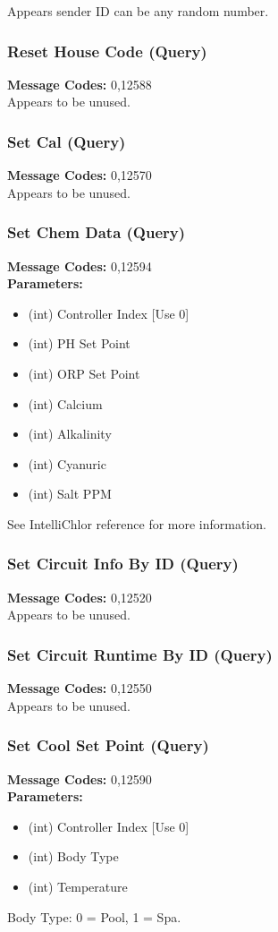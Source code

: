 \documentclass[11pt]{article}
\begin{document}
Appears sender ID can be any random number.

\subsubsection{Reset House Code (Query)}
\label{msg:12588}
{\bf Message Codes: } 0,12588\\
Appears to be unused.

\subsubsection{Set Cal (Query)}
\label{msg:12570}
{\bf Message Codes: } 0,12570\\
Appears to be unused.

\subsubsection{Set Chem Data (Query)}
\label{msg:12594}
{\bf Message Codes: } 0,12594\\
{\bf Parameters: }
\small
\begin{itemize}
\item (int) Controller Index [Use 0]
\item (int) PH Set Point
\item (int) ORP Set Point
\item (int) Calcium
\item (int) Alkalinity
\item (int) Cyanuric
\item (int) Salt PPM
\end{itemize}\normalsize
See IntelliChlor reference for more information.

\subsubsection{Set Circuit Info By ID (Query)}
\label{msg:12520}
{\bf Message Codes: } 0,12520\\
Appears to be unused.

\subsubsection{Set Circuit Runtime By ID (Query)}
\label{msg:12550}
{\bf Message Codes: } 0,12550\\
Appears to be unused.

\subsubsection{Set Cool Set Point (Query)}
\label{msg:12590}
{\bf Message Codes: } 0,12590\\
{\bf Parameters: }
\small
\begin{itemize}
\item (int) Controller Index [Use 0]
\item (int) Body Type
\item (int) Temperature
\end{itemize}
\normalsize
Body Type: 0 = Pool, 1 = Spa.
\end{document}
